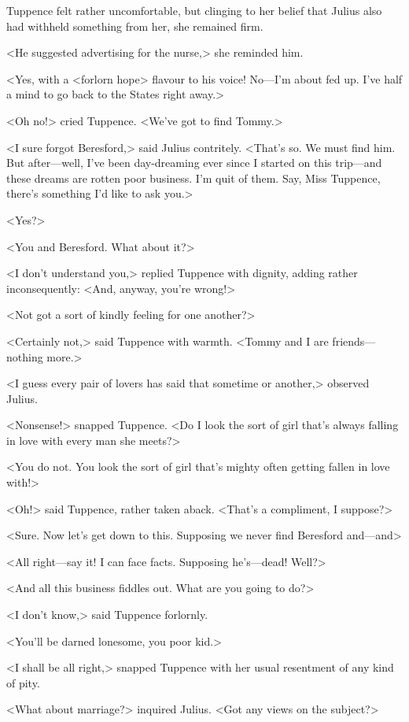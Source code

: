 Tuppence felt rather uncomfortable, but clinging to her belief that Julius also had withheld something from her, she remained firm.

<He suggested advertising for the nurse,> she reminded him.

<Yes, with a <forlorn hope> flavour to his voice! No—I'm about fed up. I've half a mind to go back to the States right away.>

<Oh no!> cried Tuppence. <We've got to find Tommy.>

<I sure forgot Beresford,> said Julius contritely. <That's so. We must find him. But after—well, I've been day-dreaming ever since I started on this trip—and these dreams are rotten poor business. I'm quit of them. Say, Miss Tuppence, there's something I'd like to ask you.>

<Yes?>

<You and Beresford. What about it?>

<I don't understand you,> replied Tuppence with dignity, adding rather inconsequently: <And, anyway, you're wrong!>

<Not got a sort of kindly feeling for one another?>

<Certainly not,> said Tuppence with warmth. <Tommy and I are friends—nothing more.>

<I guess every pair of lovers has said that sometime or another,> observed Julius.

<Nonsense!> snapped Tuppence. <Do I look the sort of girl that's always falling in love with every man she meets?>

<You do not. You look the sort of girl that's mighty often getting fallen in love with!>

<Oh!> said Tuppence, rather taken aback. <That's a compliment, I suppose?>

<Sure. Now let's get down to this. Supposing we never find Beresford and—and\longdash>

<All right—say it! I can face facts. Supposing he's—dead! Well?>

<And all this business fiddles out. What are you going to do?>

<I don't know,> said Tuppence forlornly.

<You'll be darned lonesome, you poor kid.>

<I shall be all right,> snapped Tuppence with her usual resentment of any kind of pity.

<What about marriage?> inquired Julius. <Got any views on the subject?>

